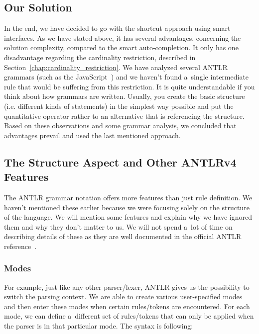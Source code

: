 \subsection{Our Solution}
\label{chap:structure_solution}

In the end, we have decided to go with the shortcut approach using smart interfaces.
As we have stated above, it has several advantages, concerning the solution complexity, compared to the smart auto-completion.
It only has one disadvantage regarding the cardinality restriction, described in Section~\ref{chap:cardinality_restriction}.
We have analyzed several ANTLR grammars (such as the JavaScript~\cite{javascript}) and we haven't found a~single intermediate rule that would be suffering from this restriction.
It is quite understandable if you think about how grammars are written.
Usually, you create the basic structure (i.e. different kinds of statements) in the simplest way possible and put the quantitative operator rather to an alternative that is referencing the structure.
\\

Based on these observations and some grammar analysis, we concluded that advantages prevail and used the last mentioned approach.

\newpage

\subsection{The Structure Aspect and Other ANTLRv4 Features}
\label{chap:antlr_features}

The ANTLR grammar notation offers more features than just rule definition.
We haven't mentioned these earlier because we were focusing solely on the structure of the language.
We will mention some features and explain why we have ignored them and why they don't matter to us.
We will not spend a~lot of time on describing details of these as they are well documented in the official ANTLR reference~\cite{ANTLR4reference}.

\subsubsection{Modes}

For example, just like any other parser/lexer, ANTLR gives us the possibility to switch the parsing context.
We are able to create various user-specified modes and then enter these modes when certain rules/tokens are encountered.
For each mode, we can define a~different set of rules/tokens that can only be applied when the parser is in that particular mode.
The syntax is following:

